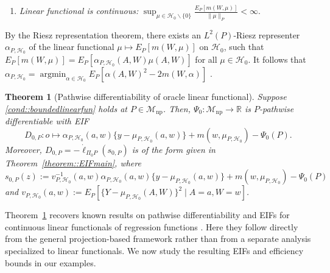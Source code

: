 \documentclass[11pt]{article}
\DeclareMathOperator*{\argmin}{argmin}
\newtheorem{theorem}{Theorem}
\theoremstyle{definition}
\begin{document}
\begin{enumerate}[label=(B\arabic*), ref=B\arabic*,series=condlinear]
\item  \textit{Linear functional is continuous:} \label{cond::boundedlinearfun} $\sup_{\mu \in \mathcal{H}_0 \backslash \{0\}} \frac{E_P[m(W,\mu)]}{\|\mu\|_P} < \infty$.
\end{enumerate}

 

 
By the Riesz representation theorem, there exists an \(L^2(P)\)-Riesz representer \(\alpha_{P,\mathcal{H}_0}\) of the linear functional \(\mu \mapsto E_P[m(W,\mu)]\) on \(\mathcal{H}_0\), such that \(E_P[m(W,\mu)] = E_P[\alpha_{P,\mathcal{H}_0}(A,W)\mu(A,W)]\) for all \(\mu \in \mathcal{H}_0\). It follows that \(\alpha_{P,\mathcal{H}_0} = \argmin_{\alpha \in \mathcal{H}_0} E_P[\alpha(A,W)^2 - 2m(W,\alpha)]\) \citep{chernozhukov2022automatic}.



 

 
\begin{theorem}[Pathwise differentiability of oracle linear functional]
    \label{theorem::boundedlinearEIF} 
    Suppose \ref{cond::boundedlinearfun} holds at $P \in \mathcal{M}_{\mathrm{np}}$. Then, $\Psi_0: \mathcal{M}_{\mathrm{np}} \rightarrow \mathbb{R}$ is $P$-pathwise differentiable with EIF 
    $$D_{0,P}: o \mapsto \alpha_{P,\mathcal{H}_0}(a,w)\{y - \mu_{P,\mathcal{H}_0}(a,w)\} + m(w,\mu_{P,\mathcal{H}_0}) - \Psi_0(P).$$ Moreover, \(D_{0,P} = -\dot{\ell}_{\Pi_0 P}(s_{0,P})\) is of the form given in Theorem~\ref{theorem::EIFmain}, where \(s_{0,P}(z) := v_{P,\mathcal{H}_0}^{-1}(a,w)\alpha_{P,\mathcal{H}_0}(a,w)\{y-\mu_{P,\mathcal{H}_0}(a,w)\} + m(w,\mu_{P,\mathcal{H}_0}) - \Psi_0(P)\) and \(v_{P,\mathcal{H}_0}(a,w) := E_P[\{Y-\mu_{P,\mathcal{H}_0}(A,W)\}^2 \mid A=a, W=w]\).

\end{theorem}

Theorem~\ref{theorem::boundedlinearEIF} recovers known results on pathwise differentiability and EIFs for continuous linear functionals of regression functions \citep{chernoRegRiesz,van2024automatic,van2025automatic}. Here they follow directly from the general projection-based framework rather than from a separate analysis specialized to linear functionals. We now study the resulting EIFs and efficiency bounds in our examples.
\end{document}
